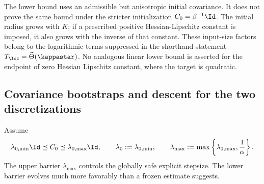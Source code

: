 \begin{remark}
\label{rem:global:spiral-scope}
The lower bound uses an admissible but anisotropic initial covariance.  It does not prove the same
bound under the stricter initialization \(C_0=\beta^{-1}\Id\).  The initial radius grows with
\(K\); if a prescribed positive Hessian-Lipschitz constant is imposed, it also grows with the
inverse of that constant.  These input-size factors belong to the logarithmic terms suppressed in
the shorthand statement
\(
T_{\loc}=\widetilde\Theta(\kappastar)
\).  No analogous linear lower bound is asserted for the endpoint of zero Hessian Lipschitz
constant, where the target is quadratic.
\end{remark}

\subsection{Covariance bootstraps and descent for the two discretizations}
\label{sec:global:discrete-upper}

Assume
\begin{equation}
\label{eq:global:initial-covariance-band}
    \lambda_{0,\min}\Id\preceq C_0\preceq\lambda_{0,\max}\Id,
    \qquad
    \lambda_0:=\lambda_{0,\min},
    \qquad
    \lambda_{\max}:=\max\left\{\lambda_{0,\max},\frac1\alpha\right\}.
\end{equation}
The upper barrier \(\lambda_{\max}\) controls the globally safe explicit stepsize.  The lower
barrier evolves much more favorably than a frozen estimate suggests.

